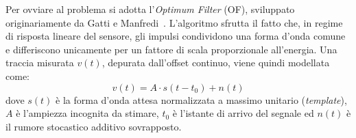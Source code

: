 Per ovviare al problema si adotta l'\textit{Optimum Filter} (OF), sviluppato originariamente da Gatti e Manfredi~\cite{GattiManfredi1986}. L'algoritmo sfrutta il fatto che, in regime di risposta lineare del sensore, gli impulsi condividono una forma d'onda comune e differiscono unicamente per un fattore di scala proporzionale all'energia. Una traccia misurata $v(t)$, depurata dall'offset continuo, viene quindi modellata come:
\begin{equation}
    v(t) = A \cdot s(t - t_0) + n(t)
    \label{eq:segnale_modello}
\end{equation}
dove $s(t)$ è la forma d'onda attesa normalizzata a massimo unitario (\textit{template}), $A$ è l'ampiezza incognita da stimare, $t_0$ è l'istante di arrivo del segnale ed $n(t)$ è il rumore stocastico additivo sovrapposto.

